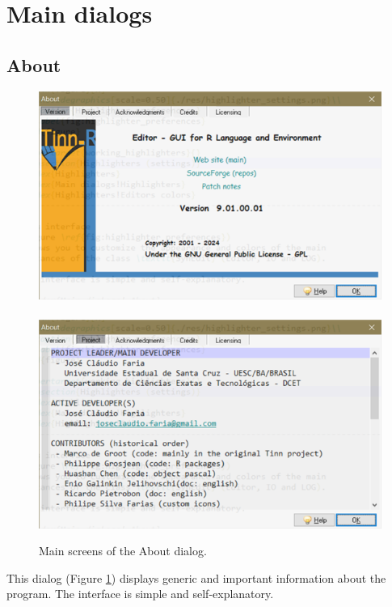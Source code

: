\hypertarget{main_dialogs}{}
\section{Main dialogs}

\hypertarget{dlg_working_about}{}
\subsection{About}

\begin{figure}[H]
  \includegraphics[scale=0.60]{./res/dlg_about.png}~~
  \includegraphics[scale=0.60]{./res/dlg_about_project.png} \\
  \caption{Main screens of the About dialog.}
  \label{fig:dlg_about}
\end{figure}
This dialog
(Figure \ref{fig:dlg_about})
displays generic and important information about the program. The interface is
simple and self-explanatory.


